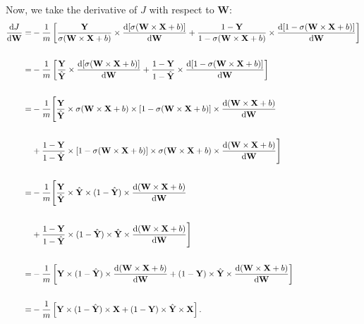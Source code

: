 \documentclass{article}
\begin{document}
\noindent Now, we take the derivative of $J$ with respect to \textbf{W}:
\begin{align*}
\diff{J}{\textbf{W}}=&-\frac{1}{m}\left[\frac{\textbf{Y}}{\sigma(\textbf{W}\times \textbf{X}+b)}\times \diff{[\sigma(\textbf{W}\times \textbf{X}+b)]}{\textbf{W}} + \frac{1-\textbf{Y}}{1-\sigma(\textbf{W}\times \textbf{X}+b)}\times \diff{[1-\sigma(\textbf{W}\times \textbf{X}+b)]}{\textbf{W}}\right]\\\\
=&-\frac{1}{m}\left[\frac{\textbf{Y}}{\hat{\textbf{Y}}}\times \diff{[\sigma(\textbf{W}\times \textbf{X}+b)]}{\textbf{W}} + \frac{1-\textbf{Y}}{1-\hat{\textbf{Y}}}\times \diff{[1-\sigma(\textbf{W}\times \textbf{X}+b)]}{\textbf{W}}\right]\\\\
=&-\frac{1}{m}\Bigg[\frac{\textbf{Y}}{\hat{\textbf{Y}}}\times \sigma(\textbf{W}\times \textbf{X}+b) \times [1-\sigma(\textbf{W}\times \textbf{X}+b)]\times \diff{(\textbf{W}\times \textbf{X}+b)}{\textbf{W}} \\\\
&+ \frac{1-\textbf{Y}}{1-\hat{\textbf{Y}}}\times [1 - \sigma(\textbf{W}\times \textbf{X}+b)] \times \sigma(\textbf{W}\times \textbf{X}+b)\times \diff{(\textbf{W}\times \textbf{X}+b)}{\textbf{W}}\Bigg]\\\\
=&-\frac{1}{m}\Bigg[\frac{\textbf{Y}}{\hat{\textbf{Y}}}\times \hat{\textbf{Y}} \times (1-\hat{\textbf{Y}})\times \diff{(\textbf{W}\times \textbf{X}+b)}{\textbf{W}} \\\\
&+ \frac{1-\textbf{Y}}{1-\hat{\textbf{Y}}}\times (1 - \hat{\textbf{Y}}) \times \hat{\textbf{Y}} \times \diff{(\textbf{W}\times \textbf{X}+b)}{\textbf{W}}\Bigg]\\\\
=&-\frac{1}{m}\left[\textbf{Y} \times (1-\hat{\textbf{Y}})\times \diff{(\textbf{W}\times \textbf{X}+b)}{\textbf{W}} + (1-\textbf{Y}) \times \hat{\textbf{Y}} \times \diff{(\textbf{W}\times \textbf{X}+b)}{\textbf{W}}\right]\\\\
=&-\frac{1}{m}\left[\textbf{Y} \times (1-\hat{\textbf{Y}}) \times \textbf{X} + (1-\textbf{Y}) \times \hat{\textbf{Y}} \times \textbf{X}\right].
\end{align*}
\end{document}
